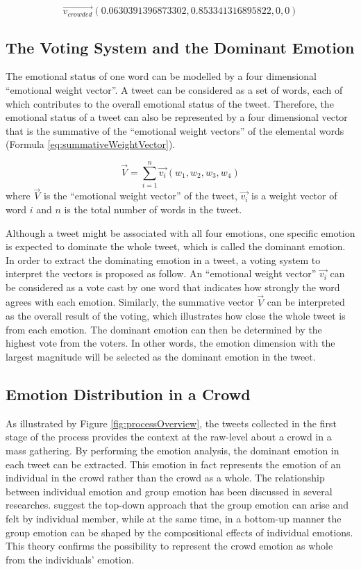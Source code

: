 \begin{equation}
\label{eq:emotionalWeightVectorOfCrowded}
	\vec{v_{crowded}}(0.0630391396873302, 0.853341316895822, 0, 0)
\end{equation}

\subsection{The Voting System and the Dominant Emotion}
The emotional status of one word can be modelled by a four dimensional ``emotional weight vector''. A tweet can be considered as a set of words, each of which contributes to the overall emotional status of the tweet. Therefore, the emotional status of a tweet can also be represented by a four dimensional vector that is the summative of the ``emotional weight vectors'' of the elemental words (Formula \ref{eq:summativeWeightVector}).

\begin{equation}
\label{eq:summativeWeightVector}
	\vec{V} = \sum_{i=1}^{n} \vec{v_i}(w_1, w_2, w_3, w_4)
\end{equation}
where \(\vec{V}\) is the ``emotional weight vector'' of the tweet, \(\vec{v_i}\) is a weight vector of word \(i\) and \(n\) is the total number of words in the tweet.

Although a tweet might be associated with all four emotions, one specific emotion is expected to dominate the whole tweet, which is called the dominant emotion. In order to extract the dominating emotion in a tweet, a voting system to interpret the vectors is proposed as follow. An ``emotional weight vector'' \(\vec{v_i}\) can be considered as a vote cast by one word that indicates how strongly the word agrees with each emotion. Similarly, the summative vector \(\vec{V}\) can be interpreted as the overall result of the voting, which illustrates how close the whole tweet is from each emotion. The dominant emotion can then be determined by the highest vote from the voters. In other words, the emotion dimension with the largest magnitude will be selected as the dominant emotion in the tweet.

\subsection{Emotion Distribution in a Crowd}
As illustrated by Figure \ref{fig:processOverview}, the tweets collected in the first stage of the process provides the context at the raw-level about a crowd in a mass gathering. By performing the emotion analysis, the dominant emotion in each tweet can be extracted. This emotion in fact represents the emotion of an individual in the crowd rather than the crowd as a whole. The relationship between individual emotion and group emotion has been discussed in several researches. \citet{barsade1998group} suggest the top-down approach that the group emotion can arise and felt by individual member, while at the same time, in a bottom-up manner the group emotion can be shaped by the compositional effects of individual emotions. This theory confirms the possibility to represent the crowd emotion as whole from the individuals' emotion.

